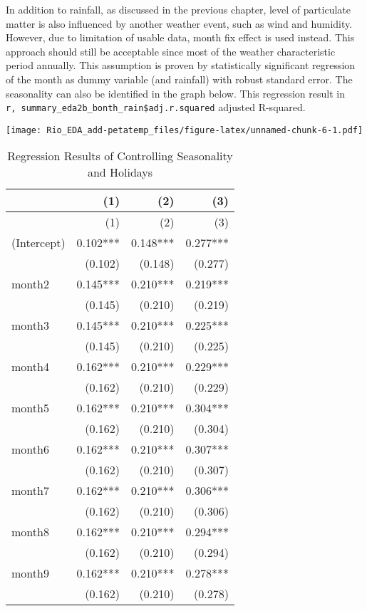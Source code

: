 \documentclass[
]{article}
\begin{document}
In addition to rainfall, as discussed in the previous chapter, level of
particulate matter is also influenced by another weather event, such as
wind and humidity. However, due to limitation of usable data, month fix
effect is used instead. This approach should still be acceptable since
most of the weather characteristic period annually. This assumption is
proven by statistically significant regression of the month as dummy
variable (and rainfall) with robust standard error. The seasonality can
also be identified in the graph below. This regression result in
\texttt{r,\ summary\_eda2b\_bonth\_rain\$adj.r.squared} adjusted
R-squared.

\texttt{[image: Rio\_EDA\_add-petatemp\_files/figure-latex/unnamed-chunk-6-1.pdf]}

\begin{longtable}[]{@{}lrrr@{}}
\caption{Regression Results of Controlling Seasonality and
Holidays}\tabularnewline
\toprule\noalign{}
& (1) & (2) & (3) \\
\midrule\noalign{}
\endfirsthead
\toprule\noalign{}
& (1) & (2) & (3) \\
\midrule\noalign{}
\endhead
\bottomrule\noalign{}
\endlastfoot
(Intercept) & 0.102*** & 0.148*** & 0.277*** \\
& (0.102) & (0.148) & (0.277) \\
month2 & 0.145*** & 0.210*** & 0.219*** \\
& (0.145) & (0.210) & (0.219) \\
month3 & 0.145*** & 0.210*** & 0.225*** \\
& (0.145) & (0.210) & (0.225) \\
month4 & 0.162*** & 0.210*** & 0.229*** \\
& (0.162) & (0.210) & (0.229) \\
month5 & 0.162*** & 0.210*** & 0.304*** \\
& (0.162) & (0.210) & (0.304) \\
month6 & 0.162*** & 0.210*** & 0.307*** \\
& (0.162) & (0.210) & (0.307) \\
month7 & 0.162*** & 0.210*** & 0.306*** \\
& (0.162) & (0.210) & (0.306) \\
month8 & 0.162*** & 0.210*** & 0.294*** \\
& (0.162) & (0.210) & (0.294) \\
month9 & 0.162*** & 0.210*** & 0.278*** \\
& (0.162) & (0.210) & (0.278) \\

\end{longtable}
\end{document}
